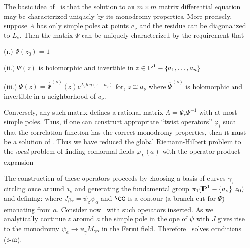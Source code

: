 
The basic idea of \holoii\ is that the solution to an $m\times m$
matrix differential equation 
\eqn{}
may be characterized uniquely by its monodromy properties. 
More precisely, suppose $A$ has only simple poles at points 
$a_\nu$ and the residue can be diagonalized to $L_\nu$. Then
the matrix $\Psi$ can be uniquely characterized by 
the requirement that 

(i.) $\Psi(z_0)=1$

(ii.) $\Psi(z)$ is holomorphic and invertible 
in $z\in\relax{\rm I\kern-.18em P}^1-\{a_1,\dots , a_n\}$

(iii.) $\Psi(z)=\hat \Psi^{(\nu)}(z)
e^{L_\nu log(z-a_\nu)}$ for, $z\cong a_\nu$
where $\hat \Psi^{(\nu)}$ is holomorphic and invertible in a neighborhood
of $a_\nu$. 

Conversely, any such matrix defines a rational matrix
$A=\Psi_z\Psi^{-1}$ with at most simple poles.
Thus, 
if one can construct appropriate ``twist operators'' 
$\varphi_i$
such that the correlation function 
\eqn{}
has the correct monodromy properties, then it must be a solution of 
\diffl . Thus we have reduced the global Riemann-Hilbert
problem to the {\it local} problem
of finding conformal fields $\varphi_{L}(a)$ with the operator 
product expansion 
\eqn{}

The construction of these operators proceeds by
choosing a basis of curves
$\gamma_\nu$ circling once around $a_\nu$ and generating the 
fundamental group $\pi_1(\relax{\rm I\kern-.18em P}^1-\{a_\nu\};z_0)$ 
and defining:
\eqn{}
where $J_{\beta\alpha}=\bar\psi_\beta\psi_\alpha$ 
and $\CC$ is a contour (a branch cut
for $\Psi$) emanating from $a$. Consider now \corr\  with such
operators inserted. As we analytically continue $z$ around
$a$ the simple pole in the ope of $\psi$ with $J$
gives rise to the monodromy $\psi_\alpha\to \psi_\gamma M_{\gamma\alpha}$
in the Fermi field. Therefore \corr\ solves 
conditions ({\it i-iii}). 

